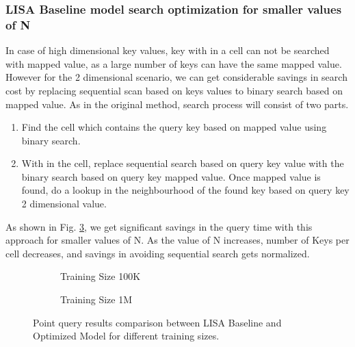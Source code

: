 \subsubsection {LISA Baseline model search optimization for smaller values of N}
In case of high dimensional key values, key with in a cell can not be searched with mapped value, as a large number of keys can have the same mapped value. However for the 2 dimensional scenario, we can get considerable savings in search cost by replacing sequential scan based on keys values to binary search based on mapped value. As in the original method, search process  will consist of two parts.
\begin{enumerate}
	\item Find the cell which contains the query key based on mapped value using binary search. 
	\item With in the cell, replace sequential search based on query key value with the  binary search based on query key mapped value. Once mapped value is found, do a lookup in the neighbourhood of the found key based on query key 2 dimensional value. 
\end{enumerate}
As shown in Fig. \ref{fig:LISA_Baseline_Optimization}, we get significant savings in the query time with this approach for smaller values of N. As the value of N increases, number of Keys per cell decreases, and savings in avoiding sequential search gets normalized. 


\begin{figure}
 \centering
     \begin{subfigure}[b]{0.45\textwidth}
         \centering
         
         \caption{Training Size 100K}
         \label{fig:2d_exp4_3_1}
     \end{subfigure}
     \begin{subfigure}[b]{0.45\textwidth}
         \centering
         
         \caption{Training Size 1M}
         \label{fig:2d_exp4_3_2}
     \end{subfigure}
     \caption{Point query results comparison between LISA Baseline and Optimized Model for different training sizes.}
     \label{fig:LISA_Baseline_Optimization}
\end{figure}

